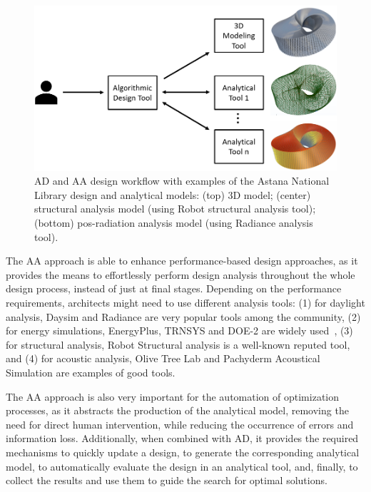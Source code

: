 \begin{figure}[htbp]
\centering
\includegraphics[width=1\textwidth]{./Images/Introduction/AlgorithmicDesignAndAnalysis_w_models2.png}
\caption[General view of the Algorithmic Design and Analysis approach]{\ac{AD} and \ac{AA} design workflow with examples of the Astana National Library design and analytical models: (top) 3D model; (center) structural analysis model (using Robot structural analysis tool); (bottom) pos-radiation analysis model (using Radiance analysis tool).}
\label{fig:algorithmicanalysis}
\end{figure}		
	
The \ac{AA} approach is able to enhance performance-based design approaches, as it provides the means to effortlessly perform design analysis throughout the whole design process, instead of just at final stages. Depending on the performance requirements, architects might need to use different analysis tools: (1) for daylight analysis, Daysim and Radiance are very popular tools among the community, (2) for energy simulations, EnergyPlus, TRNSYS and DOE-2 are widely used~\cite{Nguyen2014}, (3) for structural analysis, Robot Structural analysis is a well-known reputed tool, and (4) for acoustic analysis, Olive Tree Lab and Pachyderm Acoustical Simulation are examples of good tools.%

The \ac{AA} approach is also very important for the automation of optimization processes, as it abstracts the production of the analytical model, removing the need for direct human intervention, while reducing the occurrence of errors and information loss. Additionally, when combined with \ac{AD}, it provides the required mechanisms to quickly update a design, to generate the corresponding analytical model, to automatically evaluate the design in an analytical tool, and, finally, to collect the results and use them to guide the search for optimal solutions. 

